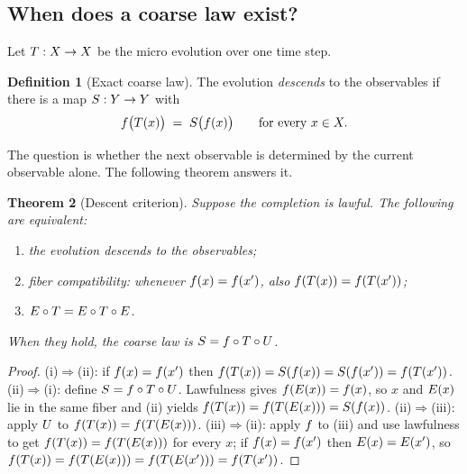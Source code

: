 \documentclass[11pt]{article}
\theoremstyle{plain}
\newtheorem{theorem}{Theorem}[section]
\theoremstyle{definition}
\newtheorem{definition}[theorem]{Definition}
\theoremstyle{remark}
\begin{document}
\subsection{When does a coarse law exist?}\label{sec:framework:descent}

Let $T:X\to X$ be the micro evolution over one time step.

\begin{definition}[Exact coarse law]\label{def:descent}
The evolution \emph{descends} to the observables if there is a map $S:Y\to Y$ with
\begin{equation}
f\big(T(x)\big) \;=\; S\big(f(x)\big)\qquad\text{for every } x\in X .
\label{eq:descent}
\end{equation}
\end{definition}

The question is whether the next observable is determined by the current observable alone. The following theorem answers it.

\begin{theorem}[Descent criterion]\label{thm:descent}
Suppose the completion is lawful. The following are equivalent:
\begin{enumerate}
  \item[(i)] the evolution descends to the observables;
  \item[(ii)] \emph{fiber compatibility}: whenever $f(x)=f(x')$, also $f(T(x))=f(T(x'))$;
  \item[(iii)] $E\circ T=E\circ T\circ E$.
\end{enumerate}
When they hold, the coarse law is $S=f\circ T\circ U$.
\end{theorem}
\begin{proof}
(i)$\Rightarrow$(ii): if $f(x)=f(x')$ then $f(T(x))=S(f(x))=S(f(x'))=f(T(x'))$. (ii)$\Rightarrow$(i): define $S=f\circ T\circ U$. Lawfulness gives $f(E(x))=f(x)$, so $x$ and $E(x)$ lie in the same fiber and (ii) yields $f(T(x))=f(T(E(x)))=S(f(x))$. (ii)$\Rightarrow$(iii): apply $U$ to $f(T(x))=f(T(E(x)))$. (iii)$\Rightarrow$(ii): apply $f$ to (iii) and use lawfulness to get $f(T(x))=f(T(E(x)))$ for every $x$; if $f(x)=f(x')$ then $E(x)=E(x')$, so $f(T(x))=f(T(E(x)))=f(T(E(x')))=f(T(x'))$.
\end{proof}
\end{document}

